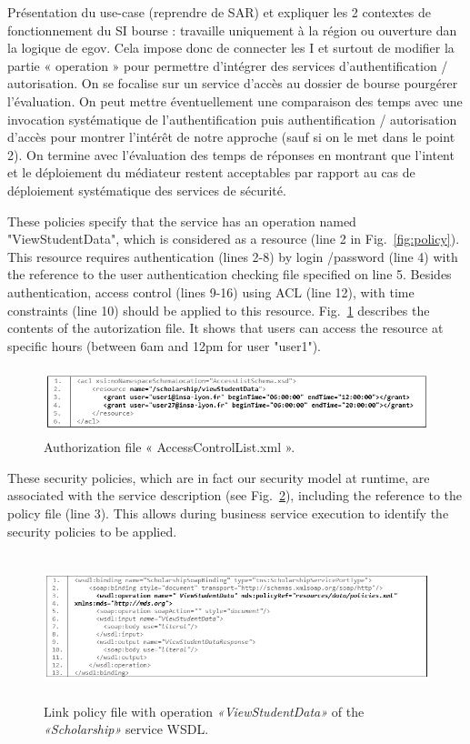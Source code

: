 \documentclass[runningheads,a4paper]{llncs}
\begin{document}
\label{sec:exemple}
Pr\'esentation du use-case (reprendre de SAR) et expliquer les 2 contextes de fonctionnement du SI bourse : travaille uniquement \`a la r\'egion ou ouverture dan la logique de egov. Cela impose donc de connecter les I et surtout de modifier la partie « operation » pour permettre d’int\'egrer des services d’authentification / autorisation. On se focalise sur un service d’acc\`es au dossier de bourse pourg\'erer l’\'evaluation.
On peut mettre \'eventuellement une comparaison des temps avec une invocation syst\'ematique de l’authentification puis authentification / autorisation d’acc\`es pour montrer l’int\'er\^et de notre approche (sauf si on le met dans le point 2). On termine avec l’\'evaluation des temps de r\'eponses en montrant que l’intent et le d\'eploiement du m\'ediateur restent acceptables par rapport au cas de d\'eploiement syst\'ematique des services de s\'ecurit\'e.






 
 
These policies specify that the service has an operation named "ViewStudentData", which is considered as a resource (line 2 in Fig.~\ref{fig:policy}). This resource requires authentication (lines 2-8) by login /password (line 4) with the reference to the user authentication checking file specified on line 5. Besides authentication, access control (lines 9-16) using ACL (line 12), with time constraints (line 10) should be applied to this resource. Fig.~\ref{fig:acl} describes the contents of the  autorization file. It shows that users can access the resource at specific hours (between 6am and 12pm for user "user1").
 
 
\begin{figure}
\centering
\includegraphics[height=55pt, width=380pt]{scholarshipAcl.png}
\caption{Authorization file « AccessControlList.xml ».}
\label{fig:acl}
\end{figure}


These security policies, which are in fact our security model at runtime, are associated with the service description (see Fig.~\ref{fig:wsdl}), including the reference to the policy file (line 3). This allows during business service execution to identify the security policies to be applied.
\begin{figure}  
\centering
\includegraphics[height=120pt, width=380pt]{scholarshipWSDL.png}
\caption{Link policy file with operation \emph{«ViewStudentData»} of the \emph{«Scholarship»} service WSDL.}
\label{fig:wsdl}
\end{figure}
\end{document}
